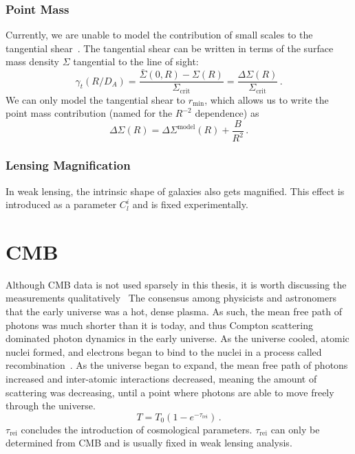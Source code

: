 \subsubsection{Point Mass}
Currently, we are unable to model the contribution of small scales to the tangential shear~\cite{maccrann_controlling_2020}. The tangential shear can be written in terms of the surface mass density $\Sigma$ tangential to the line of sight:
\begin{equation}
	\gamma_t(R/D_A) = \frac{\bar\Sigma(0,R) - \Sigma(R)}{\Sigma_\mathrm{crit}} = \frac{\Delta\Sigma(R)}{\Sigma_\mathrm{crit}}\,.
\end{equation}
We can only model the tangential shear to $r_\mathrm{min}$, which allows us to write the point mass contribution (named for the $R^{-2}$ dependence) as
\begin{equation}
	\Delta\Sigma(R) = \Delta\Sigma^{\mathrm{model}}(R) + \frac{B}{R^2}\,.
\end{equation}
\subsubsection{Lensing Magnification}
In weak lensing, the intrinsic shape of galaxies also gets magnified. This effect is introduced as a parameter $C_l^i$ and is fixed experimentally.


\section{CMB}
Although CMB data is not used sparsely in this thesis, it is worth discussing the measurements qualitatively~\cite{wayne_hu_animations_nodate,joshua_frieman_cmb_nodate,wayne_hu_thermal_nodate,hu_astro_nodate} The consensus among physicists and astronomers that the early universe was a hot, dense plasma. As such, the mean free path of photons was much shorter than it is today, and thus Compton scattering dominated photon dynamics in the early universe. As the universe cooled, atomic nuclei formed, and electrons began to bind to the nuclei in a process called recombination~\cite{scott_dodelson_modern_2021,wayne_hu_animations_nodate}. As the universe began to expand, the mean free path of photons increased and inter-atomic interactions decreased, meaning the amount of scattering was decreasing, until a point where photons are able to move freely through the universe.
\begin{equation}
	T = T_0(1-e^{-\tau_{\mathrm{rei}}})\,.
\end{equation}
$\tau_{\mathrm{rei}}$ concludes the introduction of cosmological parameters. $\tau_{\mathrm{rei}}$ can only be determined from CMB and is usually fixed in weak lensing analysis.

